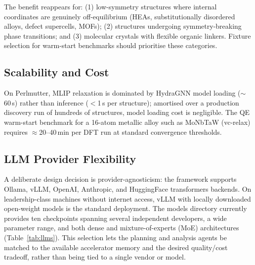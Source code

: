 \documentclass[conference]{IEEEtran}
\def\acs#1{#1}%
\begin{document}
The benefit reappears for: (1) low-symmetry structures where internal
coordinates are genuinely off-equilibrium (HEAs, substitutionally disordered
alloys, defect supercells, MOFs); (2) structures undergoing symmetry-breaking
phase transitions; and (3) molecular crystals with flexible organic linkers.
Fixture selection for warm-start benchmarks should prioritise these categories.

\subsection{Scalability and Cost}
On Perlmutter, \acs{MLIP} relaxation is dominated by HydraGNN model loading
($\sim$60\,s) rather than inference ($<$1\,s per structure); amortised over a
production discovery run of hundreds of structures, model loading cost is
negligible.
The \acs{QE} warm-start benchmark for a 16-atom metallic alloy such as MoNbTaW
(vc-relax) requires $\approx$20--40\,min per \acs{DFT} run at standard
convergence thresholds.

\subsection{LLM Provider Flexibility}
A deliberate design decision is provider-agnosticism: the framework supports
Ollama, vLLM, OpenAI, Anthropic, and HuggingFace transformers backends.
On leadership-class machines without internet access, vLLM with locally
downloaded open-weight models is the standard deployment. The models directory
currently provides ten checkpoints spanning several independent developers, a
wide parameter range, and both dense and mixture-of-experts (MoE) architectures
(Table~\ref{tab:llms}). This selection lets the planning and analysis agents be
matched to the available accelerator memory and the desired quality/cost
tradeoff, rather than being tied to a single vendor or model.
\end{document}
